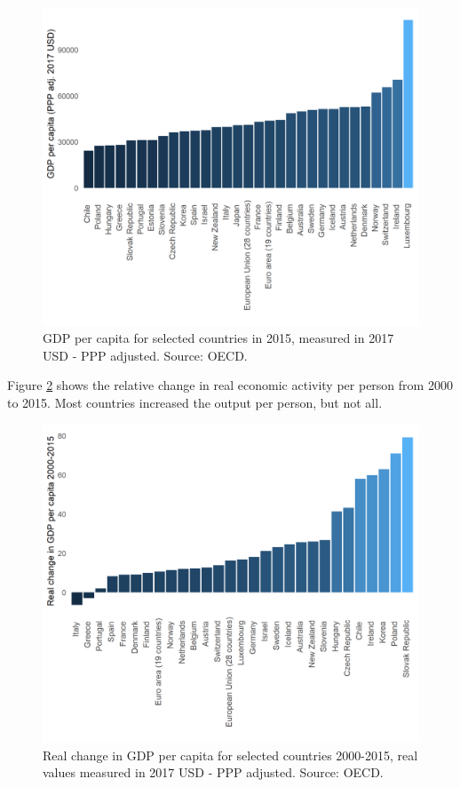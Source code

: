 \documentclass[]{book}
\begin{document}
\begin{figure}

{\centering \includegraphics[width=0.8\linewidth]{_resources/chapter_gdp/fig11} 

}

\caption{GDP per capita for selected countries in 2015, measured in 2017 USD - PPP adjusted. Source: OECD. }\label{fig:gdp14}
\end{figure}

Figure \ref{fig:gdp15} shows the relative change in real economic activity per person from 2000 to 2015. Most countries increased the output per person, but not all.

\begin{figure}

{\centering \includegraphics[width=0.8\linewidth]{_resources/chapter_gdp/fig12} 

}

\caption{Real change in GDP per capita for selected countries 2000-2015, real values measured  in 2017 USD - PPP adjusted. Source: OECD.  }\label{fig:gdp15}
\end{figure}
\end{document}
